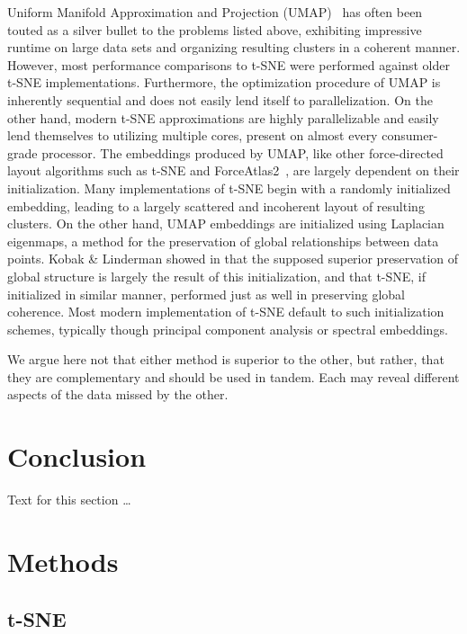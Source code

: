 \documentclass[twocolumn]{bmcart}
\begin{document}
Uniform Manifold Approximation and Projection (UMAP)~\cite{2018arXivUMAP} has often been touted as a silver bullet to the problems listed above, exhibiting impressive runtime on large data sets and organizing resulting clusters in a coherent manner. However, most performance comparisons to t-SNE were performed against older t-SNE implementations. Furthermore, the optimization procedure of UMAP is inherently sequential and does not easily lend itself to parallelization. On the other hand, modern t-SNE approximations are highly parallelizable and easily lend themselves to utilizing multiple cores, present on almost every consumer-grade processor. The embeddings produced by UMAP, like other force-directed layout algorithms such as t-SNE and ForceAtlas2~\cite{jacomy2014forceatlas2}, are largely dependent on their initialization. Many implementations of t-SNE begin with a randomly initialized embedding, leading to a largely scattered and incoherent layout of resulting clusters. On the other hand, UMAP embeddings are initialized using Laplacian eigenmaps, a method for the preservation of global relationships between data points. Kobak \& Linderman showed in \cite{kobak2019umap} that the supposed superior preservation of global structure is largely the result of this initialization, and that t-SNE, if initialized in similar manner, performed just as well in preserving global coherence. Most modern implementation of t-SNE default to such initialization schemes, typically though principal component analysis or spectral embeddings.

We argue here not that either method is superior to the other, but rather, that they are complementary and should be used in tandem. Each may reveal different aspects of the data missed by the other.

\section*{Conclusion}
Text for this section \ldots

\section*{Methods}


\subsection*{t-SNE}
\end{document}

